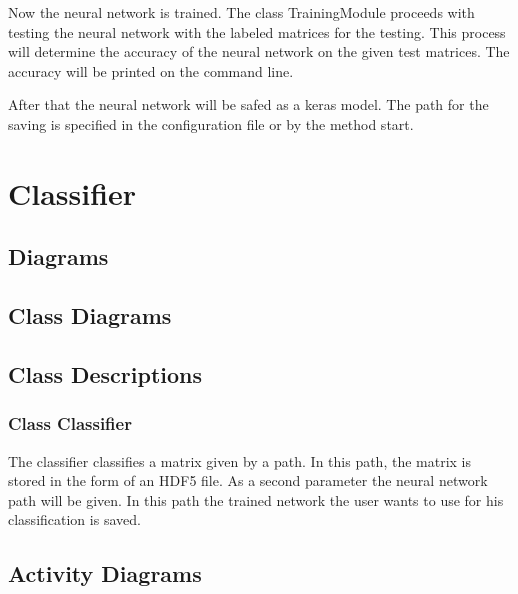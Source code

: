 \documentclass[parskip=full]{scrartcl}
\begin{document}
Now the neural network is trained. The class TrainingModule proceeds with testing the neural network with the labeled matrices for the testing.
This process will determine the accuracy of the neural network on the given test matrices.
The accuracy will be printed on the command line.\newline

After that the neural network will be safed as a keras model.
The path for the saving is specified in the configuration file or by the method start.


\newpage
\section{Classifier}

\subsection{Diagrams}

\subsection{Class Diagrams}

\begin{figure}[h]
\begin{center}

\label{Class Diagram}
\end{center}
\end{figure}

\newpage


\subsection{Class Descriptions}

\subsubsection{Class Classifier}
The classifier classifies a matrix given by a path. 
In this path, the matrix is stored in the form of an HDF5 file.
As a second parameter the neural network path will be given. 
In this path the trained network the user wants to use for his classification is saved.

\newpage
 
\subsection{Activity Diagrams}
\end{document}
